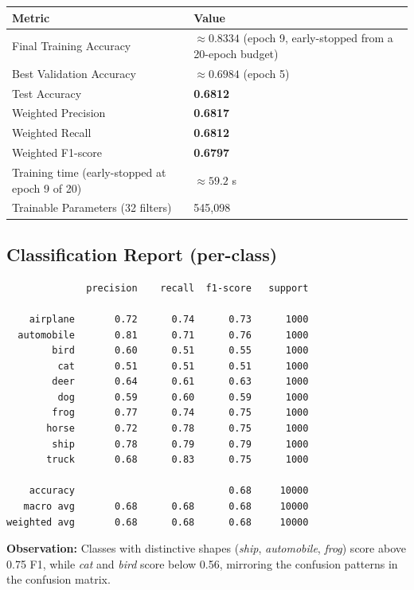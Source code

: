 \documentclass[11pt]{article}
\begin{document}
\begin{center}
\renewcommand{\arraystretch}{1.3}
\begin{tabular}{|l|l|}
\hline
\textbf{Metric} & \textbf{Value} \\
\hline
Final Training Accuracy & $\approx 0.8334$ (epoch 9, early-stopped from a 20-epoch budget) \\
\hline
Best Validation Accuracy & $\approx 0.6984$ (epoch 5) \\
\hline
Test Accuracy & \textbf{0.6812} \\
\hline
Weighted Precision & \textbf{0.6817} \\
\hline
Weighted Recall & \textbf{0.6812} \\
\hline
Weighted F1-score & \textbf{0.6797} \\
\hline
Training time (early-stopped at epoch 9 of 20) & $\approx 59.2$ s \\
\hline
Trainable Parameters (32 filters) & 545,098 \\
\hline
\end{tabular}
\end{center}

\subsection*{Classification Report (per-class)}

\begin{verbatim}
              precision    recall  f1-score   support

    airplane       0.72      0.74      0.73      1000
  automobile       0.81      0.71      0.76      1000
        bird       0.60      0.51      0.55      1000
         cat       0.51      0.51      0.51      1000
        deer       0.64      0.61      0.63      1000
         dog       0.59      0.60      0.59      1000
        frog       0.77      0.74      0.75      1000
       horse       0.72      0.78      0.75      1000
        ship       0.78      0.79      0.79      1000
       truck       0.68      0.83      0.75      1000

    accuracy                           0.68     10000
   macro avg       0.68      0.68      0.68     10000
weighted avg       0.68      0.68      0.68     10000
\end{verbatim}

\textbf{Observation:} Classes with distinctive shapes (\textit{ship}, \textit{automobile}, \textit{frog}) score above 0.75 F1, while \textit{cat} and \textit{bird} score below 0.56, mirroring the confusion patterns in the confusion matrix.
\end{document}
